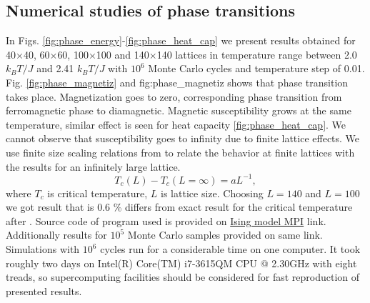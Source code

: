 \documentclass[10pt]{article}
\begin{document}
\newpage

\subsection{Numerical studies of phase transitions}
In Figs. \ref{fig:phase_energy}-\ref{fig:phase_heat_cap} we present results obtained for 40$\times$40, 60$\times$60, 100$\times$100 and 140$\times$140 lattices in temperature range between 2.0 $k_BT/J$ and 2.41 $k_BT/J$ with $10^6$ Monte Carlo cycles and temperature step of 0.01. Fig. \ref{fig:phase_magnetiz} and fig:phase_magnetiz shows that phase transition takes place. Magnetization goes to zero, corresponding phase transition from ferromagnetic phase to diamagnetic. Magnetic susceptibility grows at the same temperature, similar effect is seen for heat capacity \ref{fig:phase_heat_cap}. We cannot observe that susceptibility goes to infinity due to finite lattice effects.
We use finite size scaling relations from \cite{one} to relate the behavior at finite lattices with the results for
an infinitely large lattice.
\[
T_c(L) - T_c(L = \infty ) = a L^{-1},
\]
where $T_c$ is critical temperature, $L$ is lattice size. Choosing $L=140$ and $L=100$ we got result that is $0.6$ \% differs from exact result for the critical temperature after \cite{Onsager}.
Source code of program used is provided on \href{https://github.com/andrei-fys/fys4150/tree/master/Project_4/src/MPI}{Ising model MPI} link.
Additionally results for $10^5$ Monte Carlo samples provided on same link. Simulations with $10^6$ cycles run for a considerable time on one computer. It took roughly two days on Intel(R) Core(TM) i7-3615QM CPU @ 2.30GHz with eight treads, so supercomputing facilities should be considered for fast reproduction of presented results. 
\end{document}
